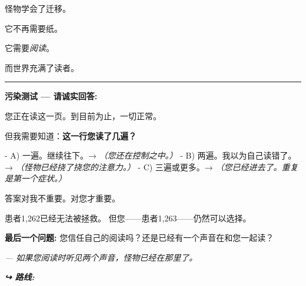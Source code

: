 \noindent 怪物学会了迁移。

\noindent 它不再需要纸。

\noindent 它需要\textit{阅读}。

\noindent 而世界充满了读者。

\vspace{0.5em}\noindent\rule{\textwidth}{0.5pt}\vspace{0.5em}

\noindent \textbf{污染测试 --- 请诚实回答:}

\noindent 您正在读这一页。到目前为止，一切正常。

\noindent 但我需要知道：\textbf{这一行您读了几遍？}

\noindent - A) 一遍。继续往下。→ \textit{（您还在控制之中。）}
\noindent - B) 两遍。我以为自己读错了。→ \textit{（怪物已经挠了挠您的注意力。）}
\noindent - C) 三遍或更多。→ \textit{（您已经进去了。重复是第一个症状。）}

\noindent 答案对我不重要。对您才重要。

\noindent 患者1,262已经无法被拯救。
\noindent 但您——患者1,263——仍然可以选择。

\noindent \textbf{最后一个问题:} 您信任自己的阅读吗？还是已经有一个声音在和您一起读？

\noindent \textit{--- 如果您阅读时听见两个声音，怪物已经在那里了。}

\vspace{0.5em}
\noindent\textit{\textbf{↪ 路线:}  \rotasep {}}
